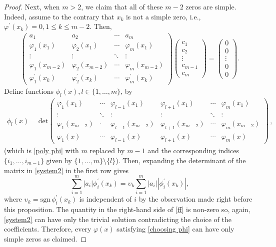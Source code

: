 \documentclass[twoside,a4paper]{amsart}
\newcommand{\sgn}{\mathrm{sgn}}
\renewcommand{\det}{\mathrm{det}}
\def\le{\leqslant}
\theoremstyle{remark}
\begin{document}
\begin{proof}
 Next, when \( m>2 \), we claim that all of these $m-2$ zeros are simple. Indeed, assume to the contrary that \( x_k \) is not a simple zero, i.e., \( \varphi^\prime(x_k) =0, 1\le k\le m-2 \). Then,
\begin{align}
\begin{pmatrix}
\label{system2}
a_1 & a_2 & \cdots & a_m \\
\varphi_1(x_1) & \varphi_2(x_1) & \cdots & \varphi_m(x_1) \\
\vdots & \vdots & \ddots & \vdots \\
\varphi_1(x_{m-2}) & \varphi_2(x_{m-2}) & \cdots & \varphi_m(x_{m-2}) \\
\varphi_1^\prime(x_k) & \varphi_2^\prime(x_k) & \cdots & \varphi_m^\prime(x_k)
\end{pmatrix} 
\begin{pmatrix}
c_1 \\ c_2 \\ \vdots \\ c_{m-1} \\ c_m    
\end{pmatrix}
= \begin{pmatrix}
0 \\ 0 \\ \vdots \\ 0 \\ 0     
\end{pmatrix}.    
\end{align}
Define functions \( \phi_l(x), l\in \{1,\ldots,m\} \), by 
\begin{align}
\label{poly phi-l}
\phi_l(x) = \det \begin{pmatrix} \varphi_{1}(x_1)&\cdots & \varphi_{l-1}(x_1) &\varphi_{l+1}(x_1)& \cdots & \varphi_{m}(x_1) \\ \vdots & \ddots&\vdots & \vdots &\ddots& \vdots \\ \varphi_{1}(x_{m-2}) &\cdot& \varphi_{l-1}(x_{m-2})&\varphi_{l+1}(x_{m-2}) & \cdots & \varphi_{m}(x_{m-2}) \\ \varphi_{1}(x) & \cdots&\varphi_{l-1}(x) & \varphi_{l+1}(x)&\cdots & \varphi_{m}(x) \end{pmatrix}\,,
\end{align}
(which is  \eqref{poly phi} with \( m \) replaced by \( m-1 \) and the corresponding indices \( \{i_1,\ldots,i_{m-1}\} \) given by \( \{1,\ldots,m\}\setminus\{l\} \)).  Then, expanding the determinant of the matrix in \eqref{system2} in the first row gives 
\begin{equation}\label{ff}
 \sum_{i=1}^m |a_i| \phi_i^\prime(x_k)=
\upsilon_k \sum_{i=1}^m |a_i| |\phi_i^\prime(x_k)|,
\end{equation}
where \( \upsilon_k=\sgn\,\phi_i^\prime(x_k) \) is independent of \( i \) by the observation made right before this proposition. The quantity in the right-hand side of \eqref{ff} is non-zero so, again, \eqref{system2} can have only the trivial solution contradicting the choice of the coefficients. Therefore, every \( \varphi(x) \) satisfying \eqref{choosing phi} can have only simple zeros as claimed. 


\end{proof}
\end{document}
